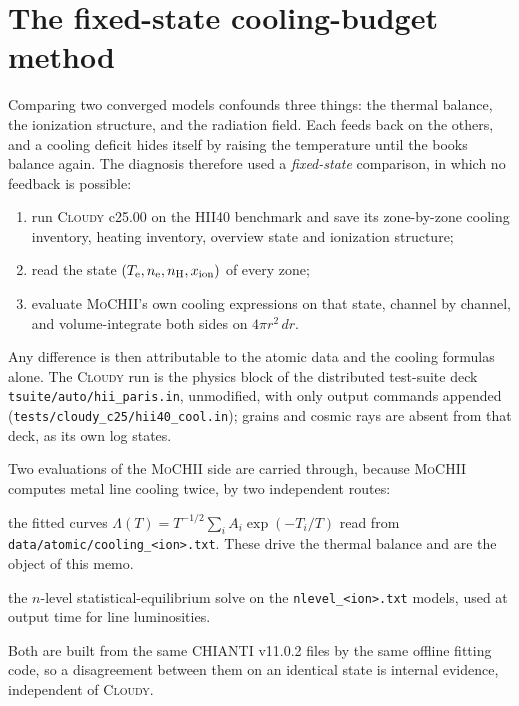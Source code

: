 \documentclass[english,a4paper]{my_memo}
\newcommand{\code}[1]{\texttt{#1}}
\newcommand{\MoCHII}{\textsc{MoCHII}}
\newcommand{\Cloudy}{\textsc{Cloudy}}
\newcommand{\Te}{T_{\rm e}}
\newcommand{\nel}{n_{\rm e}}
\newcommand{\nH}{n_{\rm H}}
\begin{document}
\section{The fixed-state cooling-budget method}
\label{sec:method}

Comparing two converged models confounds three things: the thermal balance,
the ionization structure, and the radiation field.  Each feeds back on the
others, and a cooling deficit hides itself by raising the temperature until
the books balance again.  The diagnosis therefore used a \emph{fixed-state}
comparison, in which no feedback is possible:

\begin{enumerate}\itemsep2pt
\item run \Cloudy{} c25.00 on the HII40 benchmark and save its zone-by-zone
      cooling inventory, heating inventory, overview state and ionization
      structure;
\item read the state $(\Te, \nel, \nH, x_{\rm ion})$ of every zone;
\item evaluate \MoCHII{}'s own cooling expressions on that state, channel by
      channel, and volume-integrate both sides on $4\pi r^2\,dr$.
\end{enumerate}

Any difference is then attributable to the atomic data and the cooling
formulas alone.  The \Cloudy{} run is the physics block of the distributed
test-suite deck \code{tsuite/auto/hii\_paris.in}, unmodified, with only output
commands appended (\code{tests/cloudy\_c25/hii40\_cool.in}); grains and cosmic
rays are absent from that deck, as its own log states.

Two evaluations of the \MoCHII{} side are carried through, because \MoCHII{}
computes metal line cooling twice, by two independent routes:
\begin{description}\itemsep2pt
\item[Tier-1] the fitted curves $\Lambda(T) = T^{-1/2}\sum_i A_i
      \exp(-T_i/T)$ read from \code{data/atomic/cooling\_<ion>.txt}.  These
      drive the thermal balance and are the object of this memo.
\item[Tier-2] the $n$-level statistical-equilibrium solve on the
      \code{nlevel\_<ion>.txt} models, used at output time for line
      luminosities.
\end{description}
Both are built from the same CHIANTI v11.0.2 files by the same offline
fitting code, so a disagreement between them on an identical state is internal
evidence, independent of \Cloudy{}.
\end{document}
